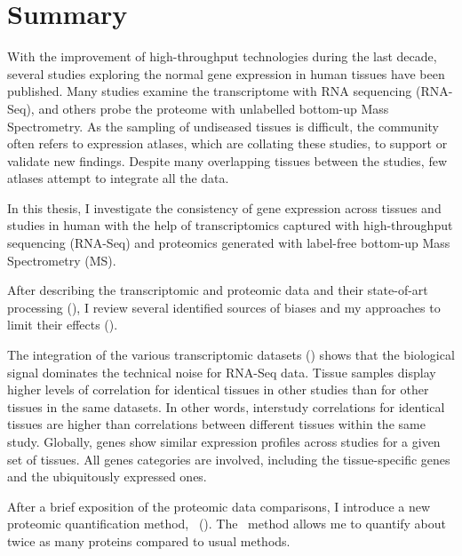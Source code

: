 \clearpage
\chapter*{Summary}\label{ch:summary}
\vspace{-1cm}
\begin{singlespace}
    {\small With the improvement of high-throughput technologies
    during the last decade,
    several studies exploring the normal gene expression in human tissues
    have been published.
    Many studies examine the transcriptome with RNA sequencing (RNA-Seq),
    and others probe the proteome with unlabelled bottom-up Mass Spectrometry.
    As the sampling of undiseased tissues is difficult,
    the community often refers to expression atlases,
    which are collating these studies,
    to support or validate new findings.
    Despite many overlapping tissues between the studies,
    few atlases attempt to integrate all the data.\mybr\

    In this thesis, I investigate the consistency of gene expression
    across tissues and studies in human
    with the help of transcriptomics
    captured with high-throughput sequencing (RNA-Seq)
    and proteomics generated with label-free bottom-up
    Mass Spectrometry (MS).\mybr\

    After describing the transcriptomic and proteomic data
    and their state-of-art processing (),
    I review several identified sources of biases
    and my approaches to limit their effects ().\mybr\

    The integration of the various transcriptomic datasets
    ()
    shows that
    the biological signal dominates the technical noise for RNA-Seq data.
    Tissue samples display higher levels of correlation
    for identical tissues in other studies than
    for other tissues in the same datasets.
    In other words, interstudy correlations for identical tissues
    are higher than correlations between different tissues within the same study.
    Globally, genes show similar expression profiles across studies
    for a given set of tissues.
    All genes categories are involved, including the tissue-specific genes
    and the ubiquitously expressed ones.\mybr\

    After a brief exposition of the proteomic data comparisons,
    I introduce a new proteomic quantification method,
    \PPKM\ ().
    The \PPKM\ method allows me to quantify about twice as many proteins
    compared to usual methods.\mybr\

}
\end{singlespace}
